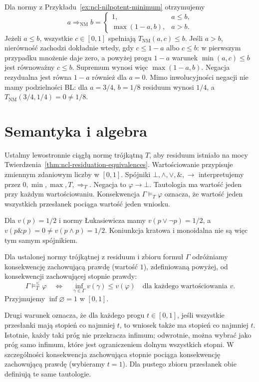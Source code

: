 \begin{przyklad}\label{ex:ncl-nm-residuum}
Dla normy z Przykładu~\ref{ex:ncl-nilpotent-minimum}
otrzymujemy
\[
 a\Rightarrow_{\mathrm{NM}}b=
 \begin{cases}
 1,&a\leq b,\\
 \max(1-a,b),&a>b.
 \end{cases}
\]
Jeżeli $a\leq b$, wszystkie $c\in[0,1]$ spełniają
$T_{\mathrm{NM}}(a,c)\leq b$. Jeśli $a>b$, nierówność
zachodzi dokładnie wtedy, gdy $c\leq1-a$ albo $c\leq b$:
w pierwszym przypadku mnożenie daje zero, a powyżej
progu $1-a$ warunek $\min(a,c)\leq b$ jest równoważny
$c\leq b$. Supremum wynosi więc $\max(1-a,b)$.
Negacja rezydualna jest równa $1-a$ również dla $a=0$.
Mimo inwolucyjności negacji nie mamy podzielności BL:
dla $a=3/4$, $b=1/8$ residuum wynosi $1/4$,
a $T_{\mathrm{NM}}(3/4,1/4)=0\ne1/8$.
\end{przyklad}

\section{Semantyka i algebra}
Ustalmy lewostronnie ciągłą normę trójkątną $T$,
aby residuum istniało na mocy
Twierdzenia~\ref{thm:ncl-residuation-equivalences}.
Wartościowanie przypisuje zmiennym zdaniowym liczby w $[0,1]$.
Spójniki $\bot,\wedge,\vee,\mathbin{\&},\to$ interpretujemy przez
$0,\min,\max,T,\Rightarrow_T$. Negacja to $\varphi\to\bot$.
Tautologia ma wartość jeden przy każdym wartościowaniu.
Konsekwencja $\Gamma\models_T\varphi$ oznacza, że wartość jeden
wszystkich przesłanek pociąga wartość jeden wniosku.
\begin{przyklad}\label{ex:ncl-distinct-conjunctions}
Dla $v(p)=1/2$ i normy Łukasiewicza mamy $v(p\vee\neg p)=1/2$,
a $v(p\mathbin{\&}p)=0\ne v(p\wedge p)=1/2$.
Koniunkcja kratowa i monoidalna nie są więc tym samym spójnikiem.
\end{przyklad}
\begin{definicja}\label{def:ncl-degree-consequence}
Dla ustalonej normy trójkątnej z residuum i zbioru formuł
$\Gamma$ odróżniamy konsekwencję zachowującą prawdę
(wartość $1$), zdefiniowaną powyżej, od konsekwencji
zachowującej stopnie prawdy:
\[
 \Gamma\models_T^{\leq}\varphi
 \quad\Longleftrightarrow\quad
 \inf_{\gamma\in\Gamma}v(\gamma)\leq v(\varphi)
 \quad\text{dla każdego wartościowania }v.
\]
Przyjmujemy $\inf\varnothing=1$ w $[0,1]$.
\end{definicja}
Drugi warunek oznacza, że dla każdego progu
$t\in[0,1]$, jeśli wszystkie przesłanki mają stopień
co najmniej $t$, to wniosek także ma stopień co najmniej $t$.
Istotnie, każdy taki próg nie przekracza infimum;
odwrotnie, można wybrać jako próg samo infimum,
które jest ograniczeniem dolnym wszystkich stopni.
W szczególności konsekwencja zachowująca stopnie pociąga
konsekwencję zachowującą prawdę (wybieramy $t=1$).
Dla pustego zbioru przesłanek obie definiują te same tautologie.

